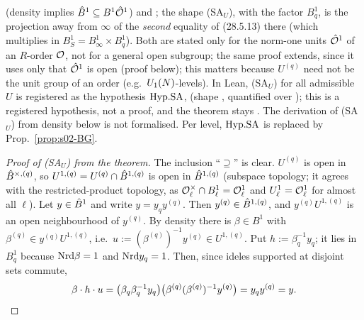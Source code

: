  (density implies $\hat{B}^1\subseteq B^1\hat{\mathcal{O}}^1$) and
; the shape (SA$_U$), with the factor $B^1_q$, is the projection away from $\infty$ of the \emph{second}
equality of (28.5.13) there (which multiplies in $B^1_S=B^1_\infty\times B^1_q$). Both are stated only for the norm-one units $\hat{\mathcal{O}}^1$ of an
$R$-order $\mathcal{O}$, not for a general open subgroup; the same proof extends, since it uses only that $\hat{\mathcal{O}}^1$ is open (proof below); this matters because $U^{(q)}$ need not be the unit group of an order (e.g.\ $U_1(N)$-levels).
In Lean, (SA$_U$) for all admissible $U$ is registered as the hypothesis $\mathrm{Hyp.SA}$,  (shape
, quantified over ); this is a registered hypothesis, not a proof, and the
theorem stays \stcited. The derivation of (SA$_U$) from density below is not formalised. Per level, $\mathrm{Hyp.SA}$ is replaced by
Prop.~\ref{prop:s02-BG}.

\begin{proof}[Proof of (SA$_U$) from the theorem]
The inclusion ``$\supseteq$'' is clear. $U^{(q)}$ is open in $\hat{B}^{\times,(q)}$, so $U^{1,(q)}=U^{(q)}\cap\hat{B}^{1,(q)}$ is open in
$\hat{B}^{1,(q)}$ (subspace topology; it agrees with the restricted-product topology, as $\mathcal{O}_\ell^\times\cap B^1_\ell=\mathcal{O}^1_\ell$ and
$U^1_\ell=\mathcal{O}^1_\ell$ for almost all $\ell$). Let $y\in\hat{B}^1$ and write $y=y_qy^{(q)}$. Then $y^{(q)}\in\hat{B}^{1,(q)}$, and
$y^{(q)}U^{1,(q)}$ is an open neighbourhood of $y^{(q)}$. By density there is $\beta\in B^1$ with $\beta^{(q)}\in y^{(q)}U^{1,(q)}$, i.e.\
$u:=(\beta^{(q)})^{-1}y^{(q)}\in U^{1,(q)}$. Put $h:=\beta_q^{-1}y_q$; it lies in $B^1_q$ because $\mathrm{Nrd}\beta=1$ and $\mathrm{Nrd} y_q=1$. Then,
since ideles supported at disjoint sets commute,
\[\beta\cdot h\cdot u=\big(\beta_q\beta_q^{-1}y_q\big)\big(\beta^{(q)}(\beta^{(q)})^{-1}y^{(q)}\big)=y_qy^{(q)}=y.\qedhere\]
\end{proof}

